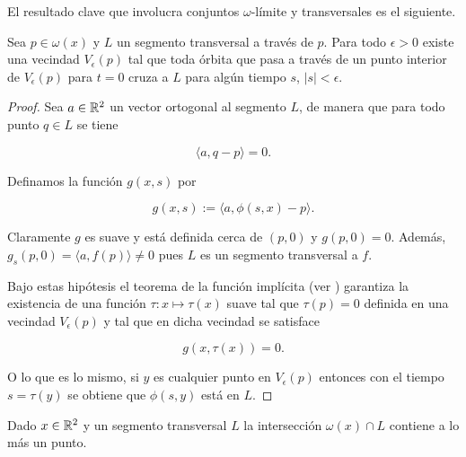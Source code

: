 El resultado clave que involucra conjuntos $\omega$-límite y transversales es el siguiente.

\begin{lemma} \label{lem:transversalexistencias}

Sea $p \in \omega(x)$ y $L$ un segmento transversal a través de $p$. Para todo $\epsilon > 0$ existe una vecindad $V_\epsilon(p)$ tal que toda órbita que pasa a través de un punto interior de $V_\epsilon(p)$ para $t = 0$ cruza a $L$ para algún tiempo $s$, $|s| < \epsilon$. 
\end{lemma}
\begin{proof}
Sea $a \in {\ensuremath{\mathbb{R}}}^2$ un vector ortogonal al segmento $L$, de manera que para todo punto $q \in L$ se tiene

$$ \langle a, q-p \rangle = 0.$$

Definamos la función $g(x,s)$ por

$$ g(x,s) := \langle a, \phi(s, x) - p \rangle.$$

Claramente $g$ es suave y está definida cerca de $(p,0)$ y $g(p,0) = 0$. Además, $g_s(p,0) = \langle a, f(p) \rangle \neq 0$ pues $L$ es un segmento transversal a $f$.

Bajo estas hipótesis el teorema de la función implícita (ver \cite{spivak,fleming}) garantiza la existencia de una función $\tau: x \mapsto \tau(x)$ suave tal que $\tau(p) = 0$ definida en una vecindad $V_\epsilon(p)$ y tal que en dicha vecindad se satisface

$$ g(x, \tau(x)) = 0. $$

O lo que es lo mismo, si $y$ es cualquier punto en $V_\epsilon(p)$ entonces con el tiempo $s = \tau(y)$ se obtiene que $\phi(s, y)$ está en $L$.

\end{proof}

\begin{proposition}Dado $x \in {\ensuremath{\mathbb{R}}}^2$ y un segmento transversal $L$ la intersección $\omega(x) \cap L$ contiene a lo más un punto.
\end{proposition}

